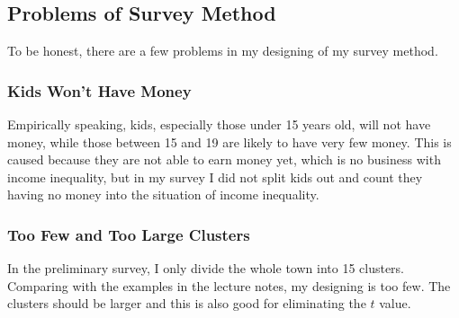 \documentclass[12pt]{article}%
\begin{document}
\subsection{Problems of Survey Method}
To be honest, there are a few problems in my designing of my survey method.

\subsubsection{Kids Won't Have Money}
Empirically speaking, kids, especially those under 15 years old, will not have money, while those between 15 and 19 are likely to have very few money.
This is caused because they are not able to earn money yet, which is no business with income inequality, but in my survey I did not split kids out and 
count they having no money into the situation of income inequality.

\subsubsection{Too Few and Too Large Clusters}
In the preliminary survey, I only divide the whole town into 15 clusters. Comparing with the examples in the lecture notes, my designing is too few. The clusters should be larger and this is also good for eliminating the $t$ value. 
\end{document}
